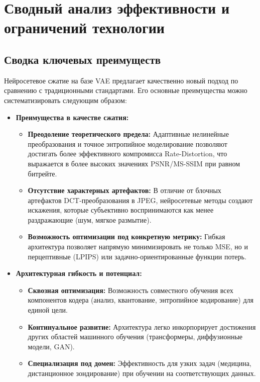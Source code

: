 \section{Сводный анализ эффективности и ограничений технологии}

\subsection{Сводка ключевых преимуществ}
Нейросетевое сжатие на базе VAE предлагает качественно новый подход по сравнению с традиционными стандартами. Его основные преимущества можно систематизировать следующим образом:

\begin{itemize}
\item \textbf{Преимущества в качестве сжатия:}
\begin{itemize}
\item \textbf{Преодоление теоретического предела:} Адаптивные нелинейные преобразования и точное энтропийное моделирование позволяют достигать более эффективного компромисса Rate-Distortion, что выражается в более высоких значениях PSNR/MS-SSIM при равном битрейте.
\item \textbf{Отсутствие характерных артефактов:} В отличие от блочных артефактов DCT-преобразования в JPEG, нейросетевые методы создают искажения, которые субъективно воспринимаются как менее раздражающие (шум, мягкое размытие).
\item \textbf{Возможность оптимизации под конкретную метрику:} Гибкая архитектура позволяет напрямую минимизировать не только MSE, но и перцептивные (LPIPS) или задачно-ориентированные функции потерь.
\end{itemize}
\item \textbf{Архитектурная гибкость и потенциал:}
\begin{itemize}
\item \textbf{Сквозная оптимизация:} Возможность совместного обучения всех компонентов кодера (анализ, квантование, энтропийное кодирование) для единой цели.
\item \textbf{Континуальное развитие:} Архитектура легко инкорпорирует достижения других областей машинного обучения (трансформеры, диффузионные модели, GAN).
\item \textbf{Специализация под домен:} Эффективность для узких задач (медицина, дистанционное зондирование) при обучении на соответствующих данных.
\end{itemize}
\end{itemize}

